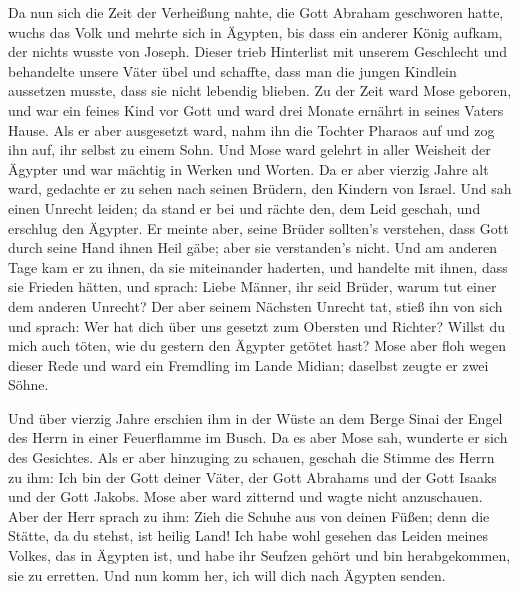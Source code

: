  Da nun sich die Zeit der Verheißung nahte, die Gott
Abraham geschworen hatte, wuchs das Volk und mehrte sich in Ägypten,
 bis dass ein anderer König aufkam, der nichts wusste von
Joseph.  Dieser trieb Hinterlist mit unserem Geschlecht
und behandelte unsere Väter übel und schaffte, dass man die jungen
Kindlein aussetzen musste, dass sie nicht lebendig blieben.
 Zu der Zeit ward Mose geboren, und war ein feines Kind
vor Gott und ward drei Monate ernährt in seines Vaters Hause.
 Als er aber ausgesetzt ward, nahm ihn die Tochter
Pharaos auf und zog ihn auf, ihr selbst zu einem Sohn. 
Und Mose ward gelehrt in aller Weisheit der Ägypter und war mächtig in
Werken und Worten.  Da er aber vierzig Jahre alt ward,
gedachte er zu sehen nach seinen Brüdern, den Kindern von Israel.
 Und sah einen Unrecht leiden; da stand er bei und rächte
den, dem Leid geschah, und erschlug den Ägypter.  Er
meinte aber, seine Brüder sollten's verstehen, dass Gott durch seine
Hand ihnen Heil gäbe; aber sie verstanden's nicht.  Und
am anderen Tage kam er zu ihnen, da sie miteinander haderten, und
handelte mit ihnen, dass sie Frieden hätten, und sprach: Liebe Männer,
ihr seid Brüder, warum tut einer dem anderen Unrecht? 
Der aber seinem Nächsten Unrecht tat, stieß ihn von sich und sprach: Wer
hat dich über uns gesetzt zum Obersten und Richter? 
Willst du mich auch töten, wie du gestern den Ägypter getötet hast?
 Mose aber floh wegen dieser Rede und ward ein Fremdling
im Lande Midian; daselbst zeugte er zwei Söhne.

 Und über vierzig Jahre erschien ihm in der Wüste an dem
Berge Sinai der Engel des Herrn in einer Feuerflamme im Busch.
 Da es aber Mose sah, wunderte er sich des Gesichtes. Als
er aber hinzuging zu schauen, geschah die Stimme des Herrn zu ihm:
 Ich bin der Gott deiner Väter, der Gott Abrahams und der
Gott Isaaks und der Gott Jakobs. Mose aber ward zitternd und wagte nicht
anzuschauen.  Aber der Herr sprach zu ihm: Zieh die
Schuhe aus von deinen Füßen; denn die Stätte, da du stehst, ist heilig
Land!  Ich habe wohl gesehen das Leiden meines Volkes,
das in Ägypten ist, und habe ihr Seufzen gehört und bin herabgekommen,
sie zu erretten. Und nun komm her, ich will dich nach Ägypten senden.

